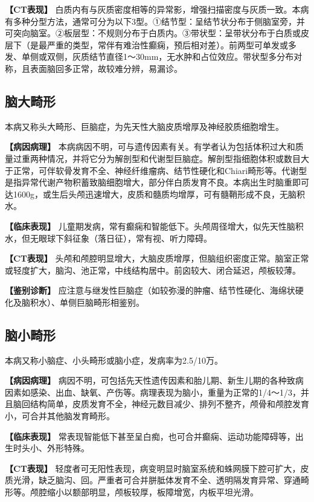 \textbf{【CT表现】}
白质内有与灰质密度相等的异常影，增强扫描密度与灰质一致。本病有多种分型方法，通常可分为以下3型。①结节型：呈结节状分布于侧脑室旁，并可突向脑室。②板层型：不规则分布于白质内。③带状型：呈带状分布于白质或皮层下（是最严重的类型，常伴有难治性癫痫，预后相对差）。前两型可单发或多发、单侧或双侧，灰质结节直径1～30mm，无水肿和占位效应。带状型多分布对称，且表面脑回多正常，故较难分辨，易漏诊。

\subsection{脑大畸形}

本病又称头大畸形、巨脑症，为先天性大脑皮质增厚及神经胶质细胞增生。

\textbf{【病因病理】}
本病病因不明，可与遗传因素有关。有学者认为包括体积过大和质量过重两种情况，并将它分为解剖型和代谢型巨脑症。解剖型指细胞体积或数目大于正常，可伴软骨发育不全、神经纤维瘤病、结节性硬化和Chiari畸形等。代谢型是指异常代谢产物积蓄致脑细胞增大，部分伴白质发育不良。本病出生时脑重即可达1600g，或生后头颅迅速增大，皮质和髓质均增厚，可有髓鞘形成不良，无脑积水。

\textbf{【临床表现】}
儿童期发病，常有癫痫和智能低下。头颅周径增大，似先天性脑积水，但无眼球下斜征象（落日征），常有视、听力障碍。

\textbf{【CT表现】}
头颅和颅腔明显增大，大脑皮质增厚，但脑组织密度正常。脑室正常或轻度扩大，脑沟、池正常，中线结构居中。前囟较大、闭合延迟，颅板较薄。

\textbf{【鉴别诊断】}
应注意与继发性巨脑症（如较弥漫的肿瘤、结节性硬化、海绵状硬化及脑积水）、单侧巨脑畸形相鉴别。

\subsection{脑小畸形}

本病又称小脑症、小头畸形或脑小症，发病率为2.5/10万。

\textbf{【病因病理】}
病因不明，可包括先天性遗传因素和胎儿期、新生儿期的各种致病因素如感染、出血、缺氧、产伤等。病理表现为脑小，重量为正常的1/4～1/3，并且脑回结构简单，皮质发育不全，神经元数目减少、排列不整齐，颅骨和颅腔发育小，可合并其他脑发育畸形。

\textbf{【临床表现】}
常表现智能低下甚至呈白痴，也可合并癫痫、运动功能障碍等，出生时头小、外形特殊。

\textbf{【CT表现】}
轻度者可无阳性表现，病变明显时脑室系统和蛛网膜下腔可扩大，皮质光滑，缺乏脑沟、回。严重者可合并胼胝体发育不全、透明隔发育异常、穿通畸形等。颅腔缩小以额部明显，颅板较厚，板障增宽，内板平坦光滑。

